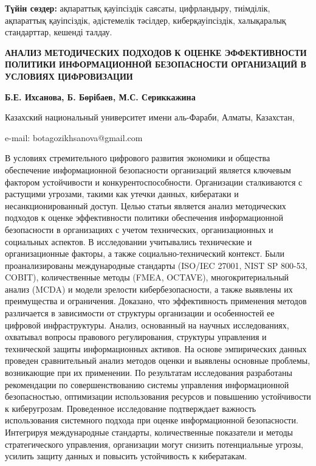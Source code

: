 {\bfseries Түйін сөздер:} ақпараттық қауіпсіздік саясаты, цифрландыру,
тиімділік, ақпараттық қауіпсіздік, әдістемелік тәсілдер,
киберқауіпсіздік, халықаралық стандарттар, кешенді талдау.

\begin{articleheader}
{\bfseries АНАЛИЗ МЕТОДИЧЕСКИХ ПОДХОДОВ К ОЦЕНКЕ ЭФФЕКТИВНОСТИ ПОЛИТИКИ
ИНФОРМАЦИОННОЙ БЕЗОПАСНОСТИ ОРГАНИЗАЦИЙ В УСЛОВИЯХ ЦИФРОВИЗАЦИИ}

{\bfseries
Б.Е. Ихсанова\textsuperscript{\envelope },
Б. Бөрібаев,
М.С. Сериккажина
}
\end{articleheader}

\begin{affiliation}
Казахский национальный университет имени аль-Фараби, Алматы, Казахстан,

e-mail: botagozikhsanova@gmail.com
\end{affiliation}

В условиях стремительного цифрового развития экономики и общества
обеспечение информационной безопасности организаций является ключевым
фактором устойчивости и конкурентоспособности. Организации сталкиваются
с растущими угрозами, такими как утечки данных, кибератаки и
несанкционированный доступ. Целью статьи является анализ методических
подходов к оценке эффективности политики обеспечения информационной
безопасности в организациях с учетом технических, организационных и
социальных аспектов. В исследовании учитывались технические и
организационные факторы, а также социально-технический контекст. Были
проанализированы международные стандарты (ISO/IEC 27001, NIST SP 800-53,
COBIT), количественные методы (FMEA, OCTAVE), многокритериальный анализ
(MCDA) и модели зрелости кибербезопасности, а также выявлены их
преимущества и ограничения. Доказано, что эффективность применения
методов различается в зависимости от структуры организации и
особенностей ее цифровой инфраструктуры. Анализ, основанный на научных
исследованиях, охватывал вопросы правового регулирования, структуры
управления и технической защиты информационных активов. На основе
эмпирических данных проведен сравнительный анализ методов оценки и
выявлены основные проблемы, возникающие при их применении. По
результатам исследования разработаны рекомендации по совершенствованию
системы управления информационной безопасностью, оптимизации
использования ресурсов и повышению устойчивости к киберугрозам.
Проведенное исследование подтверждает важность использования системного
подхода при оценке информационной безопасности. Интегрируя международные
стандарты, количественные показатели и методы стратегического
управления, организации могут снизить потенциальные угрозы, усилить
защиту данных и повысить устойчивость к кибератакам.

